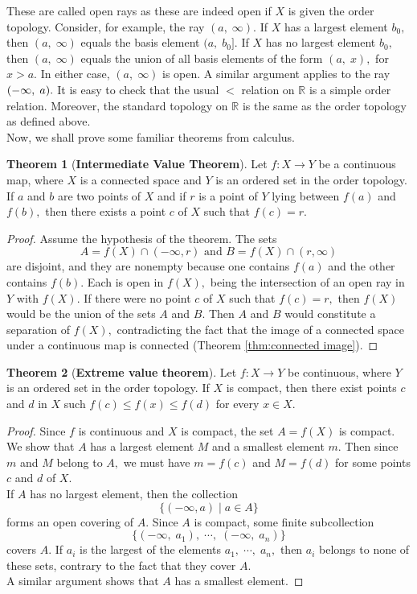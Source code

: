 \documentclass{article}
\theoremstyle{definition}
\newtheorem{theorem}{Theorem}[section]
\begin{document}
These are called open rays as these are indeed open if $X$ is given the order topology. Consider, for example, the ray $(a,\; \infty).$  If $X$ has a largest element $b_0,$ then $(a,\; \infty)$ equals the basis element $(a,\;b_0].$ If $X$ has no largest element $b_0,$ then $(a,\;\infty)$ equals the union of all basis elements of the form $(a,\;x),$ for $x > a.$ In either case, $(a,\;\infty)$ is open. A similar argument applies to the ray $(-\infty,\; a).\\$
It is easy to check that the usual $<$ relation on $\mathbb{R}$ is a simple order relation. Moreover, the standard topology on $\mathbb{R}$ is the same as the order topology as defined above.\\
Now, we shall prove some familiar theorems from calculus.
\begin{theorem}[\textbf{Intermediate Value Theorem}]
  Let $f:X\longrightarrow Y$ be a continuous map, where $X$ is a connected space and $Y$ is an ordered set in the order topology. If $a$ and $b$ are two points of $X$ and if $r$ is a point of $Y$ lying between $f(a)$ and $f(b),$ then there exists a point $c$ of $X$ such that $f(c) = r.$
\end{theorem}
\begin{proof}
  Assume the hypothesis of the theorem. The sets
  \[A = f(X) \cap (-\infty, r) \text{ and } B = f(X) \cap (r, \infty)\]
  are disjoint, and they are nonempty because one contains $f(a)$ and the other contains $f(b).$ Each is open in $f(X),$ being the intersection of an open ray in $Y$ with $f(X).$ If there were no point $c$ of $X$ such that $f(c) = r,$ then $f(X)$ would be the union of the sets $A$ and $B.$ Then $A$ and $B$ would constitute a separation of $f(X),$ contradicting the fact that the image of a connected space under a continuous map is connected (Theorem \ref{thm:connected image}).
\end{proof}
%
\begin{theorem}[\textbf{Extreme value theorem}]
  Let $f:X\longrightarrow Y$ be continuous, where $Y$ is an ordered set in the order topology. If $X$ is compact, then there exist points $c$ and $d$ in $X$ such $f(c) \le f(x) \le f(d)$ for every $x \in X.$
\end{theorem}
\begin{proof}
  Since $f$ is continuous and $X$ is compact, the set $A = f(X)$ is compact. We show that $A$ has a largest element $M$ and a smallest element $m.$ Then since $m$ and $M$ belong to $A,$ we must have $m = f(c)$ and $M = f(d)$ for some points $c$ and $d$ of $X.$\\
  If $A$ has no largest element, then the collection
  \[\{(-\infty, a)\;|\;a\in A\}\]
  forms an open covering of $A.$ Since $A$ is compact, some finite subcollection
  \[\{(-\infty,\;a_1),\;\cdots,\;(-\infty,\;a_n)\}\]
  covers $A.$ If $a_i$ is the largest of the elements $a_1,\;\cdots,\;a_n,$ then $a_i$ belongs to none of these sets, contrary to the fact that they cover $A.$\\
  A similar argument shows that $A$ has a smallest element.
\end{proof}
\end{document}
